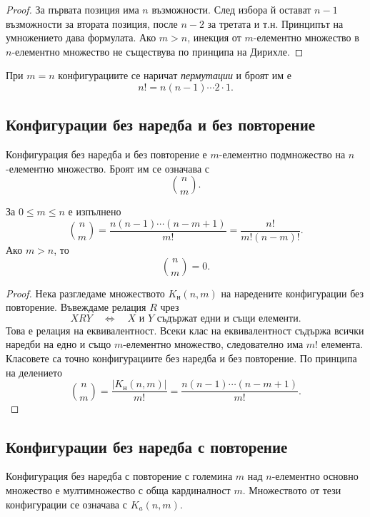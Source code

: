 \begin{proof}
За първата позиция има $n$ възможности. След избора й остават $n-1$ възможности за втората позиция, после $n-2$ за третата и т.н. Принципът на умножението дава формулата. Ако $m>n$, инекция от $m$-елементно множество в $n$-елементно множество не съществува по принципа на Дирихле.
\end{proof}

При $m=n$ конфигурациите се наричат \emph{пермутации} и броят им е
\[
n!=n(n-1)\cdots 2\cdot 1.
\]

\subsection{Конфигурации без наредба и без повторение}\label{s:2.2.3}

\begin{defn}
Конфигурация без наредба и без повторение е $m$-елементно подмножество на $n$-елементно множество. Броят им се означава с
\[
\binom{n}{m}.
\]
\end{defn}

\begin{keythm}
За $0\leq m\leq n$ е изпълнено
\[
\binom{n}{m}
=
\frac{n(n-1)\cdots(n-m+1)}{m!}
=
\frac{n!}{m!(n-m)!}.
\]
Ако $m>n$, то
\[
\binom{n}{m}=0.
\]
\end{keythm}



\begin{proof}
Нека разгледаме множеството $K_{\mathrm{н}}(n,m)$ на наредените конфигурации без повторение. Въвеждаме релация $R$ чрез
\[
XRY
\quad\Longleftrightarrow\quad
X\text{ и }Y\text{ съдържат едни и същи елементи}.
\]
Това е релация на еквивалентност. Всеки клас на еквивалентност съдържа всички наредби на едно и също $m$-елементно множество, следователно има $m!$ елемента. Класовете са точно конфигурациите без наредба и без повторение. По принципа на делението
\[
\binom{n}{m}
=
\frac{|K_{\mathrm{н}}(n,m)|}{m!}
=
\frac{n(n-1)\cdots(n-m+1)}{m!}.
\]
\end{proof}

\subsection{Конфигурации без наредба с повторение}\label{s:2.2.4}

\begin{defn}
Конфигурация без наредба с повторение с големина $m$ над $n$-елементно основно множество е мултимножество с обща кардиналност $m$. Множеството от тези конфигурации се означава с $K_a(n,m)$.
\end{defn}

